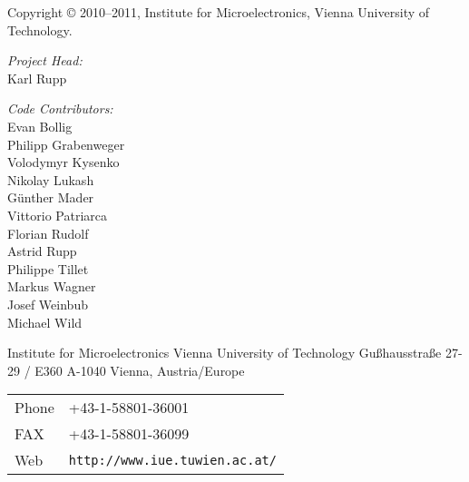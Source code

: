 
\clearpage

Copyright {\copyright} 2010--2011, Institute for Microelectronics, Vienna University of Technology.

\vspace{2.5cm}

\textit{Project Head:}\\ 

Karl Rupp\\

\vspace{2.5cm}

\textit{Code Contributors:} \\

Evan Bollig \\
Philipp Grabenweger \\
Volodymyr Kysenko \\
Nikolay Lukash \\
G\"unther Mader \\
Vittorio Patriarca \\
Florian Rudolf \\
Astrid Rupp \\
Philippe Tillet \\
Markus Wagner \\
Josef Weinbub \\
Michael Wild \\



\vspace{5.0cm}

Institute for Microelectronics\newline
Vienna University of Technology\newline
Gu\ss hausstra\ss e 27-29 / E360\newline
A-1040 Vienna, Austria/Europe\newline


\begin{tabular}{ll}
Phone  & +43-1-58801-36001\\
FAX    & +43-1-58801-36099\\
Web    & \texttt{http://www.iue.tuwien.ac.at/}
\end{tabular}



